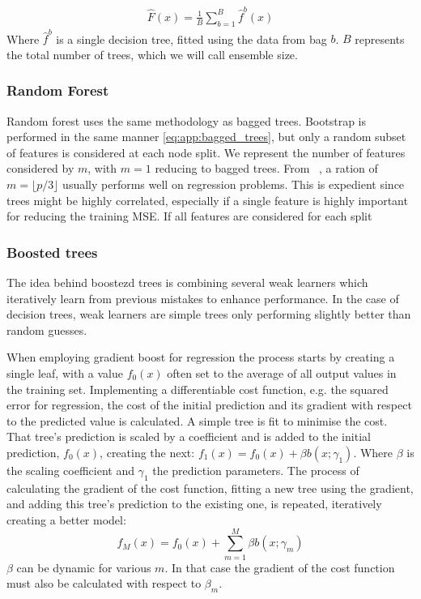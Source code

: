             \begin{align}
                \hat{F}(x) = \frac{1}{B}\sum_{b = 1}^{B} \hat{f}^b (x) \label{eq:app:bagged_trees}
            \end{align}
            Where $\hat{f}^b$ is a single decision tree, fitted using the data from bag $b$. $B$ represents the total number of trees, which we will call ensemble size.

            \subsubsection{Random Forest}
            Random forest uses the same methodology as bagged trees. Bootstrap is performed in the same manner \cref{eq:app:bagged_trees}, but only a random subset of features is considered at each node split. We represent the number of features considered by $m$, with $m = 1$ reducing to bagged trees. From ~\citep{hastie01statisticallearning}, a ration of $m = \lfloor p/3 \rfloor$ usually performs well on regression problems. This is expedient since trees might be highly correlated, especially if a single feature is highly important for reducing the training MSE. If all features are considered for each split 
            
            \subsubsection{Boosted trees}
                The idea behind boostezd trees is combining several weak learners which iteratively learn from previous mistakes to enhance performance. In the case of decision trees, weak learners are simple trees only performing slightly better than random guesses. 

                When employing gradient boost for regression the process starts by creating a single leaf, with a value $f_0(x)$ often set to the average of all output values in the training set. Implementing a differentiable cost function, e.g. the squared error for regression, the cost of the initial prediction and its gradient with respect to the predicted value is calculated. A simple tree is fit to minimise the cost. That tree's prediction is scaled by a coefficient and is added to the initial prediction, $f_0(x)$, creating the next: $f_1(x) = f_0(x) + \beta b(x;\gamma_1)$. Where $\beta$ is the scaling coefficient and $\gamma_1$ the prediction parameters. The process of calculating the gradient of the cost function, fitting a new tree using the gradient, and adding this tree's prediction to the existing one, is repeated, iteratively creating a better model: 
                \begin{equation}
                    f_M(x) = f_0(x) + \sum_{m=1}^M \beta b(x; \gamma_m)
                \end{equation}
                $\beta$ can be dynamic for various $m$. In that case the gradient of the cost function must also be calculated with respect to $\beta_m$. 


